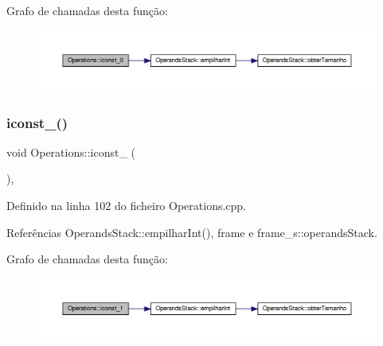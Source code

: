 Grafo de chamadas desta função\+:\nopagebreak
\begin{figure}[H]
\begin{center}
\leavevmode
\includegraphics[width=350pt]{classOperations_a89879486791daebe6659b96688465c9d_cgraph}
\end{center}
\end{figure}
\mbox{\label{classOperations_a3933ba76ead633a53683ff8491a313ea}} 
\subsubsection{\texorpdfstring{iconst\+\_()}{iconst\_1()}}
{\footnotesize\ttfamily void Operations\+::iconst\+\_ (\begin{DoxyParamCaption}{ }\end{DoxyParamCaption})\hspace{0.3cm}{\ttfamily [static]}, {\ttfamily [private]}}



Definido na linha 102 do ficheiro Operations.\+cpp.



Referências Operands\+Stack\+::empilhar\+Int(), frame e frame\+\_\+s\+::operands\+Stack.

Grafo de chamadas desta função\+:\nopagebreak
\begin{figure}[H]
\begin{center}
\leavevmode
\includegraphics[width=350pt]{classOperations_a3933ba76ead633a53683ff8491a313ea_cgraph}
\end{center}
\end{figure}
\mbox{\label{classOperations_af1a4f99f0d99da0a7db7fc926932a3c8}} 
